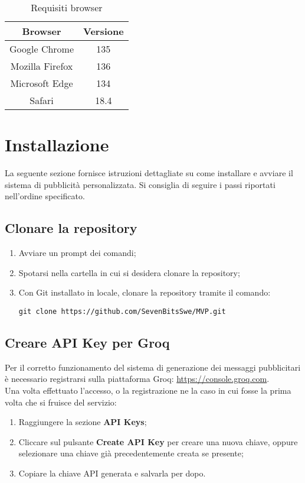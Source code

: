 \documentclass[10pt]{article}
\begin{document}
\begin{justify}
\begin{table}[H]
    \centering
    \begin{tabular}{|c|c|}
        \hline
        \rowcolor{gray!25}
        Browser & Versione \\
        \hline
        Google Chrome & 135\\
        \hline
        Mozilla Firefox & 136\\
        \hline
        Microsoft Edge & 134\\
        \hline
        Safari & 18.4\\
        \hline
    \end{tabular}
    \caption{Requisiti browser}
    \label{tab:requisiti_browser}
\end{table}

\newpage

\section{Installazione}
\label{sec:installazione}
La seguente sezione fornisce istruzioni dettagliate su come installare e avviare il sistema di pubblicità personalizzata. Si consiglia di seguire i passi riportati nell'ordine specificato.

\subsection{Clonare la repository}
\begin{enumerate}
    \item Avviare un prompt dei comandi;
    \item Spotarsi nella cartella in cui si desidera clonare la repository;
    \item Con Git installato in locale, clonare la repository tramite il comando:
\begin{verbatim}
git clone https://github.com/SevenBitsSwe/MVP.git
\end{verbatim}
\end{enumerate}

\subsection{Creare API Key per Groq}
Per il corretto funzionamento del sistema di generazione dei messaggi pubblicitari è necessario registrarsi sulla piattaforma Groq: \url{https://console.groq.com}.\\
Una volta effettuato l'accesso, o la registrazione ne la caso in cui fosse la prima volta che si fruisce del servizio:
\begin{enumerate}
    \item Raggiungere la sezione \textbf{API Keys};
    \item Cliccare sul pulsante \textbf{Create API Key} per creare una nuova chiave, oppure selezionare una chiave già precedentemente creata se presente;
    \item Copiare la chiave API generata e salvarla per dopo.
\end{enumerate}


\end{justify}
\end{document}
